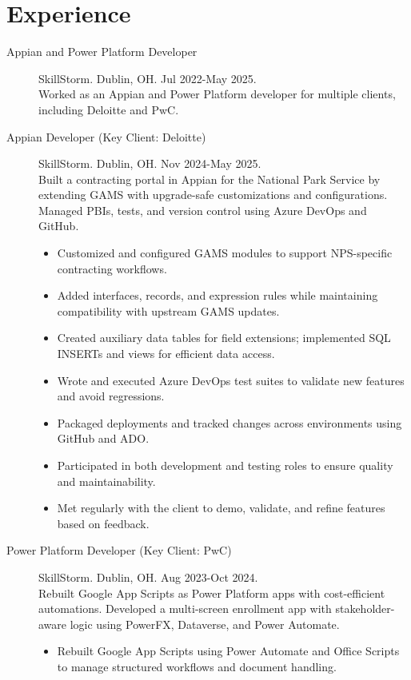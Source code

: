 \documentclass{article}
\begin{document}
\section*{Experience}\vspace{-0.5em}
\begin{description}
  \item[Appian and Power Platform Developer] SkillStorm. Dublin, OH. Jul 2022-May 2025. \\
  Worked as an Appian and Power Platform developer for multiple clients, including Deloitte and PwC.
  \item[Appian Developer (Key Client: Deloitte)] SkillStorm. Dublin, OH. Nov 2024-May 2025. \\
  Built a contracting portal in Appian for the National Park Service by extending GAMS with upgrade-safe customizations and configurations. Managed PBIs, tests, and version control using Azure DevOps and GitHub.
  \begin{itemize}
    \item Customized and configured GAMS modules to support NPS-specific contracting workflows.
    \item Added interfaces, records, and expression rules while maintaining compatibility with upstream GAMS updates.
    \item Created auxiliary data tables for field extensions; implemented SQL INSERTs and views for efficient data access.
    \item Wrote and executed Azure DevOps test suites to validate new features and avoid regressions.
    \item Packaged deployments and tracked changes across environments using GitHub and ADO.
    \item Participated in both development and testing roles to ensure quality and maintainability.
    \item Met regularly with the client to demo, validate, and refine features based on feedback.
  \end{itemize}
  \item[Power Platform Developer (Key Client: PwC)] SkillStorm. Dublin, OH. Aug 2023-Oct 2024. \\
  Rebuilt Google App Scripts as Power Platform apps with cost-efficient automations. Developed a multi-screen enrollment app with stakeholder-aware logic using PowerFX, Dataverse, and Power Automate.
  \begin{itemize}
    \item Rebuilt Google App Scripts using Power Automate and Office Scripts to manage structured workflows and document handling.

\end{itemize}
\end{description}
\end{document}
